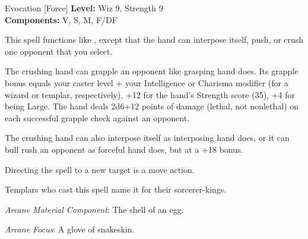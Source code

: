 {Evocation [Force]}
{
	\textbf{Level:}
	Wiz 9, Strength 9\\
	\textbf{Components:}
	V, S, M, F/DF\\
}
{
	This spell functions like , except that the hand can interpose itself, push, or crush one opponent that you select.

	The crushing hand can grapple an opponent like grasping hand does. Its grapple bonus equals your caster level + your Intelligence or Charisma modifier (for a wizard or templar, respectively), +12 for the hand's Strength score (35), +4 for being Large. The hand deals 2d6+12 points of damage (lethal, not nonlethal) on each successful grapple check against an opponent.

	The crushing hand can also interpose itself as interposing hand does, or it can bull rush an opponent as forceful hand does, but at a +18 bonus.

	Directing the spell to a new target is a move action.

	Templars who cast this spell name it for their sorcerer-kings.

	\textit{Arcane Material Component}:
	The shell of an egg.

	\textit{Arcane Focus}:
	A glove of snakeskin.

}
